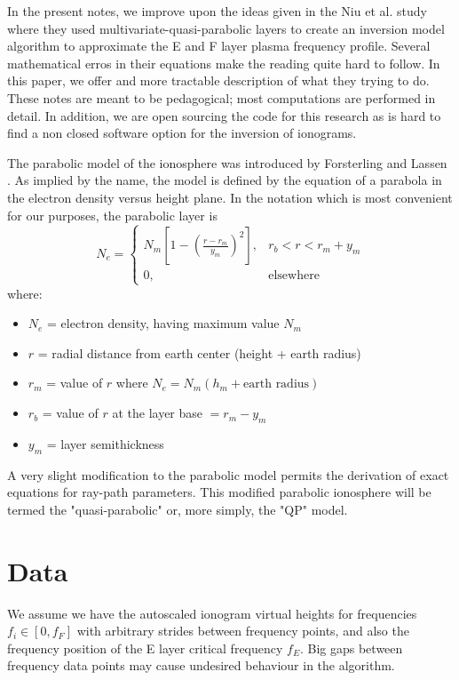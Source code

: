 \documentclass[aps,twocolumn,prb,showpacs,superscriptaddress]{revtex4-2}
\newcommand{\+}{\dagger}
\begin{document}
In the present notes, we improve upon the ideas given in the Niu et al. \cite{niu2024} study where they used multivariate-quasi-parabolic layers to create an inversion model algorithm to approximate the E and F layer plasma frequency profile. Several mathematical erros in their equations make the reading quite hard to follow. In this paper, we offer and more tractable description of what they trying to do. These notes are meant to be pedagogical; most computations are performed in detail. In addition, we are open sourcing the code for this research as is hard to find a non closed software option for the inversion of ionograms. 

The parabolic model of the ionosphere was introduced by Forsterling and Lassen \cite{forsterling1931}. As implied by the name, the model is defined by the equation of a parabola in the electron density versus height plane. In the notation which is most convenient for our purposes, the parabolic layer is
\begin{equation}
N_e = 
\begin{cases}
N_m \left[ 1 - \left( \frac{r - r_m}{y_m} \right)^2 \right], & r_b < r < r_m + y_m \\
0, & \text{elsewhere}
\end{cases}
\end{equation}
where:
\begin{itemize}
    \item $N_e$ = electron density, having maximum value $N_m$
    \item $r$ = radial distance from earth center (height + earth radius)
    \item $r_m$ = value of $r$ where $N_e = N_m (h_m + \text{earth radius})$
    \item $r_b$ = value of $r$ at the layer base $= r_m - y_m$
    \item $y_m$ = layer semithickness
\end{itemize}

A very slight modification to the parabolic model permits the derivation of exact equations for ray-path parameters. This modified parabolic ionosphere will be termed the "quasi-parabolic" or, more simply, the "QP" model.

\section{Data}

We assume we have the autoscaled ionogram virtual heights for frequencies $f_i \in [0, f_F ]$ with arbitrary strides between frequency points, and also the frequency position of the E layer
critical frequency $f_E$. Big gaps between frequency data points may cause undesired behaviour in the algorithm.
\end{document}
